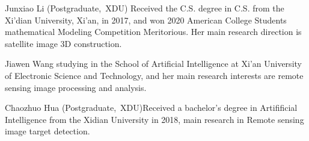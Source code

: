 \documentclass[journal]{IEEEtran}
\begin{document}
 \begin{IEEEbiography}{Junxiao Li}
(Postgraduate,~XDU) Received the
C.S. degree in C.S. from the Xi'dian University, Xi'an, in 2017, and won 2020
American College Students mathematical Modeling
Competition Meritorious. Her main research direction is satellite image 3D construction.
\end{IEEEbiography}

  \begin{IEEEbiography}{Jiawen Wang}
    studying in the School of Artificial Intelligence at Xi'an University of Electronic Science and Technology, and her main research interests are remote sensing image processing and analysis.
 \end{IEEEbiography}

 \begin{IEEEbiography}{Chaozhuo Hua}
(Postgraduate,~XDU)Received a bachelor's degree in Artifificial Intelligence from the Xidian University in 2018, main research in 
Remote sensing image target detection.
\end{IEEEbiography}
\end{document}
